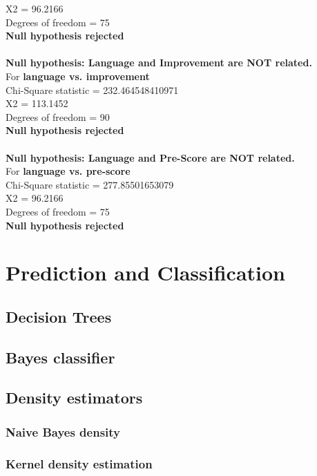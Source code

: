\documentclass[10pt]{article}
\begin{document}
 X2 = 96.2166\\
 Degrees of freedom = 75\\
 \textbf{Null hypothesis rejected}\\
\\
\textbf{Null hypothesis: Language and Improvement are NOT related.}\\
 For \textbf{language vs. improvement}\\
 Chi-Square statistic = 232.464548410971\\
 X2 = 113.1452\\
 Degrees of freedom = 90\\
 \textbf{Null hypothesis rejected}\\
\\
\textbf{Null hypothesis: Language and Pre-Score are NOT related.}\\
 For \textbf{language vs. pre-score}\\
 Chi-Square statistic = 277.85501653079\\
 X2 = 96.2166\\
 Degrees of freedom = 75\\
 \textbf{Null hypothesis rejected}\\

\newpage
\section{Prediction and Classification}
\subsection{Decision Trees}
\subsection{Bayes classifier}
\subsection{Density estimators}
\subsubsection{Naive Bayes density}
\subsubsection{Kernel density estimation}
\end{document}
